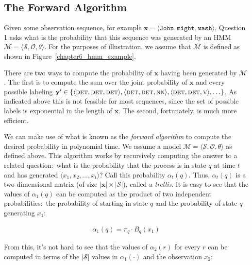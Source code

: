 \subsection{The Forward Algorithm}
\label{chapter6_forward}

Given some observation sequence, for example $\textbf{x} = \langle
\texttt{John}, \texttt{might}, \texttt{wash} \rangle$, Question 1 asks
what is the probability that this sequence was generated by an HMM
$\mathcal{M} = \langle \mathcal{S}, \mathcal{O}, \theta \rangle$.  For
the purposes of illustration, we assume that $\mathcal{M}$ is defined
as shown in Figure~\ref{chapter6_hmm_example}.

There are two ways to compute the probability of $\textbf{x}$ having
been generated by $\mathcal{M}$.  The first is to compute the sum over
the joint probability of $\textbf{x}$ and every possible labeling
$\textbf{y}' \in \{ \langle \textsc{det} , \textsc{det}, \textsc{det}
\rangle, \langle \textsc{det} , \textsc{det}, \textsc{nn} \rangle,
\langle \textsc{det} , \textsc{det}, \textsc{v} \rangle , \ldots \}$.
As indicated above this is not feasible for most sequences, since the
set of possible labels is exponential in the length of $\textbf{x}$.
The second, fortunately, is much more efficient.

We can make use of what is known as the \emph{forward algorithm} to
compute the desired probability in polynomial time.  We assume a model
$\mathcal{M} = \langle \mathcal{S}, \mathcal{O}, \theta \rangle$ as
defined above.  This algorithm works by recursively computing the
answer to a related question:\ what is the probability that the
process is in state $q$ at time $t$ and has generated $\langle x_1,
x_2, \ldots , x_t \rangle$?  Call this probability $\alpha_t(q)$.
Thus, $\alpha_t(q)$ is a two dimensional matrix (of size $|\textbf{x}|
\times |\mathcal{S}|$), called a \emph{trellis}.  It is easy to see
that the values of $\alpha_1(q)$ can be computed as the product of two
independent probabilities:\ the probability of starting in state $q$
and the probability of state $q$ generating $x_1$:

\begin{eqnarray*}
\alpha_1(q) = \pi_q \cdot B_q(x_1)
\end{eqnarray*}

\noindent From this, it's not hard to see that the values of
$\alpha_2(r)$ for every $r$ can be computed in terms of the
$|\mathcal{S}|$ values in $\alpha_1(\cdot)$ and the observation $x_2$:

